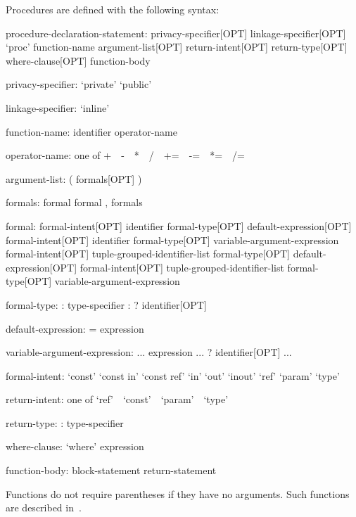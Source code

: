 Procedures are defined with the following syntax:
\begin{syntax}
procedure-declaration-statement:
  privacy-specifier[OPT] linkage-specifier[OPT] `proc' function-name argument-list[OPT] return-intent[OPT] return-type[OPT] where-clause[OPT]
    function-body

privacy-specifier:
  `private'
  `public'

linkage-specifier:
  `inline'

function-name:
  identifier
  operator-name

operator-name: one of
  + $ $ $ $ - $ $ $ $ * $ $ $ $ / $ $ $ $ %
  += $ $ $ $ -= $ $ $ $ *= $ $ $ $ /= $ $ $ $ %

argument-list:
  ( formals[OPT] )

formals:
  formal
  formal , formals

formal:
  formal-intent[OPT] identifier formal-type[OPT] default-expression[OPT]
  formal-intent[OPT] identifier formal-type[OPT] variable-argument-expression
  formal-intent[OPT] tuple-grouped-identifier-list formal-type[OPT] default-expression[OPT]
  formal-intent[OPT] tuple-grouped-identifier-list formal-type[OPT] variable-argument-expression



formal-type:
  : type-specifier
  : ? identifier[OPT]

default-expression:
  = expression

variable-argument-expression:
  ... expression
  ... ? identifier[OPT]
  ...

formal-intent:
  `const'
  `const in'
  `const ref'
  `in'
  `out'
  `inout'
  `ref'
  `param'
  `type'

return-intent: one of
  `ref' $ $ $ $ `const' $ $ $ $ `param' $ $ $ $ `type'

return-type:
  : type-specifier

where-clause:
  `where' expression

function-body:
  block-statement
  return-statement
\end{syntax}


Functions do not require parentheses if they have no arguments.  Such
functions are described in~.

